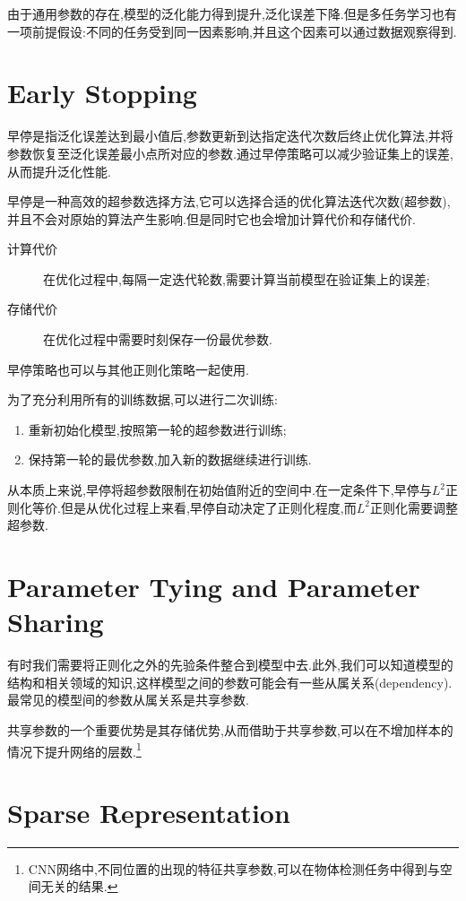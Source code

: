由于通用参数的存在,模型的泛化能力得到提升,泛化误差下降.但是多任务学习也有一项前提假设:不同的任务受到同一因素影响,并且这个因素可以通过数据观察得到.

\section{Early Stopping}

早停是指泛化误差达到最小值后,参数更新到达指定迭代次数后终止优化算法,并将参数恢复至泛化误差最小点所对应的参数.通过早停策略可以减少验证集上的误差,从而提升泛化性能.

早停是一种高效的超参数选择方法,它可以选择合适的优化算法迭代次数(超参数),并且不会对原始的算法产生影响.但是同时它也会增加计算代价和存储代价.
\begin{description}
    \item [计算代价]在优化过程中,每隔一定迭代轮数,需要计算当前模型在验证集上的误差;
    \item [存储代价]在优化过程中需要时刻保存一份最优参数.
\end{description}

早停策略也可以与其他正则化策略一起使用.

为了充分利用所有的训练数据,可以进行二次训练:
\begin{enumerate}
    \item 重新初始化模型,按照第一轮的超参数进行训练;
    \item 保持第一轮的最优参数,加入新的数据继续进行训练.
\end{enumerate}

从本质上来说,早停将超参数限制在初始值附近的空间中.在一定条件下,早停与$L^2$正则化等价.但是从优化过程上来看,早停自动决定了正则化程度,而$L^2$正则化需要调整超参数.

\section{Parameter Tying and Parameter Sharing}

有时我们需要将正则化之外的先验条件整合到模型中去.此外,我们可以知道模型的结构和相关领域的知识,这样模型之间的参数可能会有一些从属关系(dependency).最常见的模型间的参数从属关系是共享参数.

共享参数的一个重要优势是其存储优势,从而借助于共享参数,可以在不增加样本的情况下提升网络的层数.\footnote{CNN网络中,不同位置的出现的特征共享参数,可以在物体检测任务中得到与空间无关的结果.}

\section{Sparse Representation}

